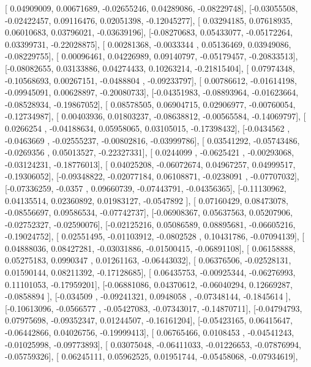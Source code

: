 \documentclass{article}
\begin{document}
       [ 0.04909009,  0.00671689, -0.02655246,  0.04289086, -0.08229748],
       [-0.03055508, -0.02422457,  0.09116476,  0.02051398, -0.12045277],
       [ 0.03294185,  0.07618935,  0.06010683,  0.03796021, -0.03639196],
       [-0.08270683,  0.05433077, -0.05172264,  0.03399731, -0.22028875],
       [ 0.00281368, -0.0033344 ,  0.05136469,  0.03949086, -0.08229755],
       [ 0.00096461,  0.04226989,  0.09140797, -0.05179457, -0.20833513],
       [-0.08082655,  0.03133886,  0.04274433,  0.10263214, -0.21815404],
       [ 0.07974348, -0.10568693,  0.00267151, -0.0488804 , -0.09233797],
       [ 0.00786612, -0.01614198, -0.09945091,  0.00628897, -0.20080733],
       [-0.04351983, -0.08893964, -0.01623664, -0.08528934, -0.19867052],
       [ 0.08578505,  0.06904715,  0.02906977, -0.00760054, -0.12734987],
       [ 0.00403936,  0.01803237, -0.08638812, -0.00565584, -0.14069797],
       [ 0.0266254 , -0.04188634,  0.05958065,  0.03105015, -0.17398432],
       [-0.0434562 , -0.0463669 , -0.02555237, -0.00802816, -0.03999786],
       [ 0.03541292, -0.05743486, -0.0269356 ,  0.05013527, -0.22327331],
       [ 0.0244099 , -0.0625421 , -0.00293068, -0.03124231, -0.18776013],
       [ 0.04025208, -0.06072674,  0.04967257,  0.04999517, -0.19306052],
       [-0.09348822, -0.02077184,  0.06108871, -0.0238091 , -0.07707032],
       [-0.07336259, -0.0357    ,  0.09660739, -0.07443791, -0.04356365],
       [-0.11130962,  0.04135514,  0.02360892,  0.01983127, -0.0547892 ],
       [ 0.07160429,  0.08473078, -0.08556697,  0.09586534, -0.07742737],
       [-0.06908367,  0.05637563,  0.05207906, -0.02752327, -0.02590076],
       [-0.02125216,  0.05086589,  0.08895681, -0.06605216, -0.19024752],
       [ 0.02551495, -0.01103912, -0.0802528 ,  0.10431786, -0.07094139],
       [ 0.04888036,  0.08427281, -0.03031886, -0.01500415, -0.06891108],
       [ 0.06158888,  0.05275183,  0.0990347 ,  0.01261163, -0.06443032],
       [ 0.06376506, -0.02528131,  0.01590144,  0.08211392, -0.17128685],
       [ 0.06435753, -0.00925344, -0.06276993,  0.11101053, -0.17959201],
       [-0.06881086,  0.04370612, -0.06040294,  0.12669287, -0.0858894 ],
       [-0.034509  , -0.09241321,  0.0948058 , -0.07348144, -0.1845614 ],
       [-0.10613096, -0.0566577 , -0.05427083, -0.07343017, -0.14870711],
       [-0.04794793,  0.07975698, -0.09352347,  0.01244507, -0.16161204],
       [-0.05423165,  0.06415647, -0.06442866,  0.04026756, -0.19999413],
       [ 0.06765466,  0.0108453 , -0.04541243, -0.01025998, -0.09773893],
       [ 0.03075048, -0.06411033, -0.01226653, -0.07876994, -0.05759326],
       [ 0.06245111,  0.05962525,  0.01951744, -0.05458068, -0.07934619],
\end{document}
